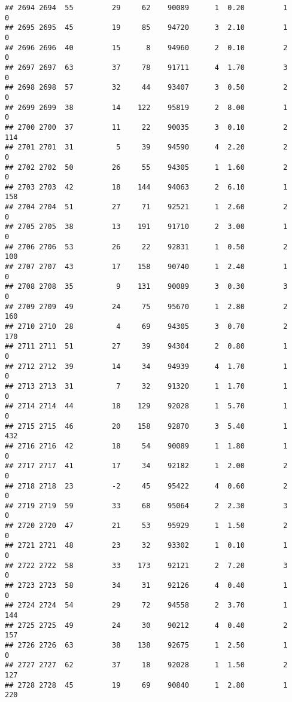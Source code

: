 \documentclass[
]{article}
\begin{document}
\begin{verbatim}
## 2694 2694  55         29     62    90089      1  0.20         1        0
## 2695 2695  45         19     85    94720      3  2.10         1        0
## 2696 2696  40         15      8    94960      2  0.10         2        0
## 2697 2697  63         37     78    91711      4  1.70         3        0
## 2698 2698  57         32     44    93407      3  0.50         2        0
## 2699 2699  38         14    122    95819      2  8.00         1        0
## 2700 2700  37         11     22    90035      3  0.10         2      114
## 2701 2701  31          5     39    94590      4  2.20         2        0
## 2702 2702  50         26     55    94305      1  1.60         2        0
## 2703 2703  42         18    144    94063      2  6.10         1      158
## 2704 2704  51         27     71    92521      1  2.60         2        0
## 2705 2705  38         13    191    91710      2  3.00         1        0
## 2706 2706  53         26     22    92831      1  0.50         2      100
## 2707 2707  43         17    158    90740      1  2.40         1        0
## 2708 2708  35          9    131    90089      3  0.30         3        0
## 2709 2709  49         24     75    95670      1  2.80         2      160
## 2710 2710  28          4     69    94305      3  0.70         2      170
## 2711 2711  51         27     39    94304      2  0.80         1        0
## 2712 2712  39         14     34    94939      4  1.70         1        0
## 2713 2713  31          7     32    91320      1  1.70         1        0
## 2714 2714  44         18    129    92028      1  5.70         1        0
## 2715 2715  46         20    158    92870      3  5.40         1      432
## 2716 2716  42         18     54    90089      1  1.80         1        0
## 2717 2717  41         17     34    92182      1  2.00         2        0
## 2718 2718  23         -2     45    95422      4  0.60         2        0
## 2719 2719  59         33     68    95064      2  2.30         3        0
## 2720 2720  47         21     53    95929      1  1.50         2        0
## 2721 2721  48         23     32    93302      1  0.10         1        0
## 2722 2722  58         33    173    92121      2  7.20         3        0
## 2723 2723  58         34     31    92126      4  0.40         1        0
## 2724 2724  54         29     72    94558      2  3.70         1      144
## 2725 2725  49         24     30    90212      4  0.40         2      157
## 2726 2726  63         38    138    92675      1  2.50         1        0
## 2727 2727  62         37     18    92028      1  1.50         2      127
## 2728 2728  45         19     69    90840      1  2.80         1      220

\end{verbatim}
\end{document}
